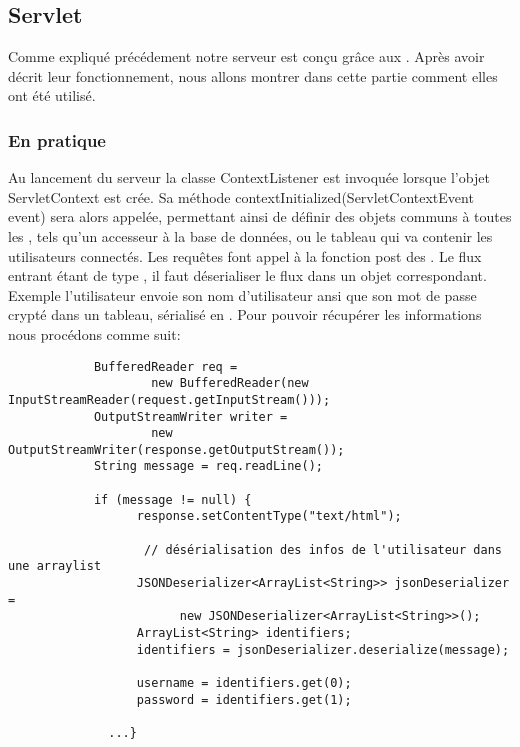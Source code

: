 
		
	
		
\subsection{Servlet}
	
		Comme expliqué précédement notre serveur est conçu grâce aux .
		Après avoir décrit leur fonctionnement, nous allons montrer dans cette partie
		comment elles ont été utilisé.
		
	\subsubsection{En pratique}
		Au lancement du serveur la classe ContextListener est invoquée lorsque l'objet
		ServletContext est crée. Sa méthode contextInitialized(ServletContextEvent event) sera alors appelée, 
		permettant ainsi de définir des objets communs à toutes les
		, tels qu'un accesseur à la base de données, ou le tableau qui va
		contenir les utilisateurs connectés.	
		Les requêtes font appel à la fonction post des . Le flux entrant étant
		de type , il faut déserialiser le flux dans un objet correspondant. Exemple
		l'utilisateur envoie son nom d'utilisateur ansi que son mot de passe crypté
		dans un tableau, sérialisé en .
		Pour pouvoir récupérer les informations nous procédons comme suit: 
		
		\begin{verbatim}
			BufferedReader req = 
				    new BufferedReader(new InputStreamReader(request.getInputStream()));
			OutputStreamWriter writer = 
				    new OutputStreamWriter(response.getOutputStream());
			String message = req.readLine();
			
			if (message != null) {
				  response.setContentType("text/html");
				
				   // désérialisation des infos de l'utilisateur dans une arraylist 
				  JSONDeserializer<ArrayList<String>> jsonDeserializer = 
					    new JSONDeserializer<ArrayList<String>>();
				  ArrayList<String> identifiers;
				  identifiers = jsonDeserializer.deserialize(message);
				
				  username = identifiers.get(0);
				  password = identifiers.get(1);
				  
			  ...}
		\end{verbatim}
		
